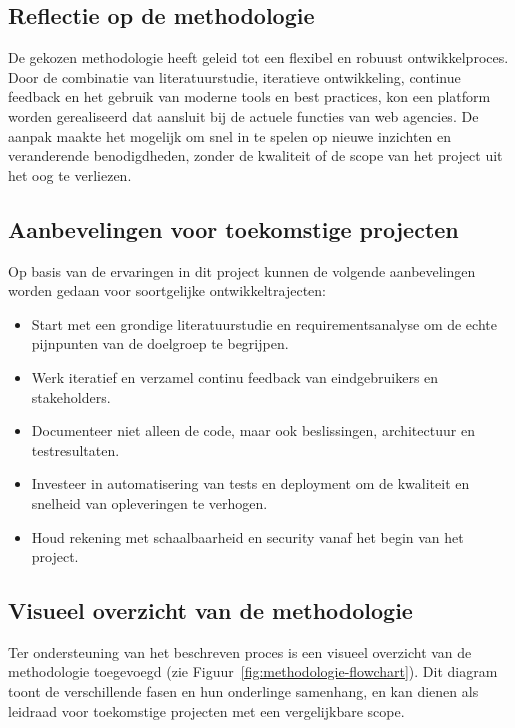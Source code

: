 \subsection{Reflectie op de methodologie}
De gekozen methodologie heeft geleid tot een flexibel en robuust ontwikkelproces. Door de combinatie van literatuurstudie, iteratieve ontwikkeling, continue feedback en het gebruik van moderne tools en best practices, kon een platform worden gerealiseerd dat aansluit bij de actuele functies van web agencies. De aanpak maakte het mogelijk om snel in te spelen op nieuwe inzichten en veranderende benodigdheden, zonder de kwaliteit of de scope van het project uit het oog te verliezen.

\subsection{Aanbevelingen voor toekomstige projecten}
Op basis van de ervaringen in dit project kunnen de volgende aanbevelingen worden gedaan voor soortgelijke ontwikkeltrajecten:
\begin{itemize}
    \item Start met een grondige literatuurstudie en requirementsanalyse om de echte pijnpunten van de doelgroep te begrijpen.
    \item Werk iteratief en verzamel continu feedback van eindgebruikers en stakeholders.
    \item Documenteer niet alleen de code, maar ook beslissingen, architectuur en testresultaten.
    \item Investeer in automatisering van tests en deployment om de kwaliteit en snelheid van opleveringen te verhogen.
    \item Houd rekening met schaalbaarheid en security vanaf het begin van het project.
\end{itemize}

\subsection{Visueel overzicht van de methodologie}
Ter ondersteuning van het beschreven proces is een visueel overzicht van de methodologie toegevoegd (zie Figuur~\ref{fig:methodologie-flowchart}). Dit diagram toont de verschillende fasen en hun onderlinge samenhang, en kan dienen als leidraad voor toekomstige projecten met een vergelijkbare scope.






